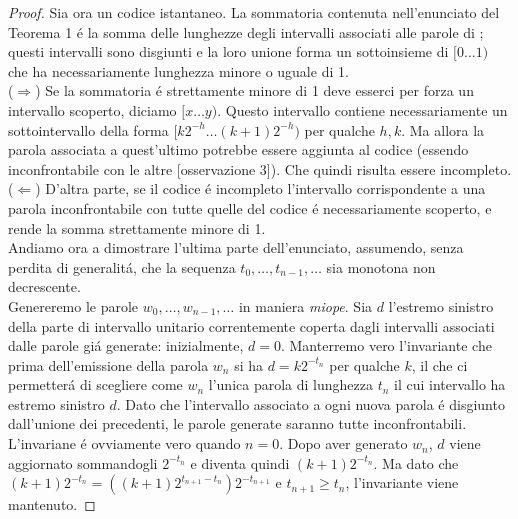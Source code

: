 \begin{proof}
    Sia ora  un codice istantaneo. La sommatoria contenuta nell'enunciato del Teorema 1 é la somma delle lunghezze degli intervalli associati alle parole di ; questi intervalli sono disgiunti e la loro unione forma un sottoinsieme di $[0\dots1)$ che ha necessariamente lunghezza minore o uguale di 1.\\
    ($\Longrightarrow$) Se la sommatoria é strettamente minore di 1 deve esserci per forza un intervallo scoperto, diciamo $[x \dots y)$. Questo intervallo contiene necessariamente un sottointervallo della forma $[k2^{-h} \dots (k + 1)2^{-h})$ per qualche $h, k$. Ma allora la parola associata a quest'ultimo potrebbe essere aggiunta al codice (essendo inconfrontabile con le altre [osservazione 3]). Che quindi risulta essere incompleto.\\
    ($\Longleftarrow$) D'altra parte, se il codice é incompleto l'intervallo corrispondente a una parola inconfrontabile con tutte quelle del codice é necessariamente scoperto, e rende la somma strettamente minore di 1.\\
    Andiamo ora a dimostrare l'ultima parte dell'enunciato, assumendo, senza perdita di generalitá, che la sequenza $t_0, \dots, t_{n - 1}, \dots$ sia monotona non decrescente.\\
    Genereremo le parole  $w_0, \dots, w_{n - 1}, \dots$ in maniera \textit{miope}. Sia $d$ l'estremo sinistro della parte di intervallo unitario correntemente coperta dagli intervalli associati dalle parole giá generate: inizialmente, $d = 0$. Manterremo vero l'invariante che prima dell'emissione della parola $w_n$ si ha $d = k2^{-t_n}$ per qualche $k$, il che ci permetterá di scegliere come $w_n$ l'unica parola di lunghezza $t_n$ il cui intervallo ha estremo sinistro $d$. Dato che l'intervallo associato a ogni nuova parola é disgiunto dall'unione dei precedenti, le parole generate saranno tutte inconfrontabili.\\
    L'invariane é ovviamente vero quando $n = 0$. Dopo aver generato $w_n$, $d$ viene aggiornato sommandogli $2^{-t_n}$ e diventa quindi $(k + 1)2^{-t_n}$. Ma dato che $(k + 1)2^{-t_n} = ((k + 1)2^{t_{n + 1}-t_n})2^{-t_{n + 1}}$ e $t_{n + 1} \geq t_n$, l'invariante viene mantenuto.
    \qedhere
\end{proof}
